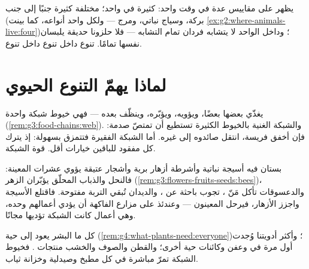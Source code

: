 \begin{remark}\label{rem:g5:biodiversity:scales}
يظهر  على مقاييس عدة في وقت واحد:  كثيرة في 
واحد؛  مختلفة كثيرة جنبًا إلى جنب (بركة، وسياج نباتي، ومرج
--- ولكل واحد أنواعه، كما بينت
\cref{ex:g2:where-animals-live:four})؛ وداخل  الواحد لا
يتشابه فردان تمام التشابه --- فلا حلزونا حديقة يلبسان  نفسها
تمامًا. تنوع داخل تنوع داخل تنوع.
\end{remark}

\section{لماذا يهمّ التنوع الحيوي}

\begin{proposition}\label{prop:g5:biodiversity:web}
  يغذّي بعضها بعضًا، ويؤويه، ويؤبّره، وينظّف بعده ---
فهي خيوط شبكة واحدة (\cref{rem:g3:food-chains:web}). والشبكة
الغنية بالخيوط الكثيرة تستطيع أن تمتصّ صدمة: فإن أخفق  فريسة،
انتقل صائدوه إلى غيره. أما الشبكة الفقيرة فتتمزق بسهولة: إذ يترك
كل  مفقود للباقين خيارات أقل.  قوة الشبكة.
\end{proposition}
\admitted

\begin{example}\label{ex:g5:biodiversity:orchard}
بستان فيه أسيجة نباتية وأشرطة أزهار برية وأشجار عتيقة يؤوي عشرات
 المعينة: فالنحل والذباب المحلّق يؤبّران الزهر
(\cref{rem:g3:flowers-fruits-seeds:bees})، والدعسوقات تأكل مَنّ
،  تجوب باحثة عن ، والديدان تُبقي التربة
مفتوحة. فاقتلع الأسيجة واجزز الأزهار، فيرحل المعينون --- وعندئذ
على مزارع الفاكهة أن يؤدي أعمالهم وحده، وهي أعمال كانت الشبكة
تؤديها مجانًا.
\end{example}

\begin{example}\label{ex:g5:biodiversity:people}
كل ما  البشر يعود إلى  حية
(\cref{rem:g4:what-plants-need:everyone})؛ وأكثر أدويتنا وُجدت أول
مرة في  وعفن وكائنات حية أخرى؛ والقطن والصوف والخشب 
منتجات . فخيوط الشبكة تمرّ مباشرة في كل مطبخ وصيدلية وخزانة
ثياب.
\end{example}

